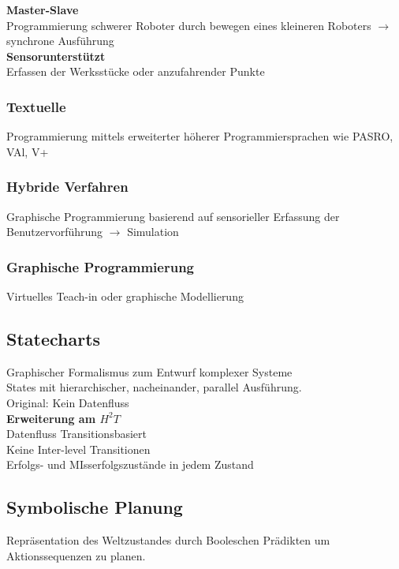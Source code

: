 \textbf{Master-Slave}\\
Programmierung schwerer Roboter durch bewegen eines kleineren Roboters \(\rightarrow\) synchrone Ausführung\\

\textbf{Sensorunterstützt}\\
Erfassen der Werksstücke oder anzufahrender Punkte


\subsubsection{Textuelle}
Programmierung mittels erweiterter höherer Programmiersprachen wie PASRO, VAl, V+


\subsubsection{Hybride Verfahren}
Graphische Programmierung basierend auf sensorieller Erfassung der Benutzervorführung \(\rightarrow\) Simulation


\subsubsection{Graphische Programmierung}
Virtuelles Teach-in oder graphische Modellierung


\subsection{Statecharts}
Graphischer Formalismus zum Entwurf komplexer Systeme\\
States mit hierarchischer, nacheinander, parallel Ausführung.\\
Original: Kein Datenfluss\\

\textbf{Erweiterung am \(H^2T\)}\\
Datenfluss Transitionsbasiert\\
Keine Inter-level Transitionen\\
Erfolgs- und MIsserfolgszustände in jedem Zustand


\subsection{Symbolische Planung}
Repräsentation des Weltzustandes durch Booleschen Prädikten um Aktionssequenzen zu planen.\\

